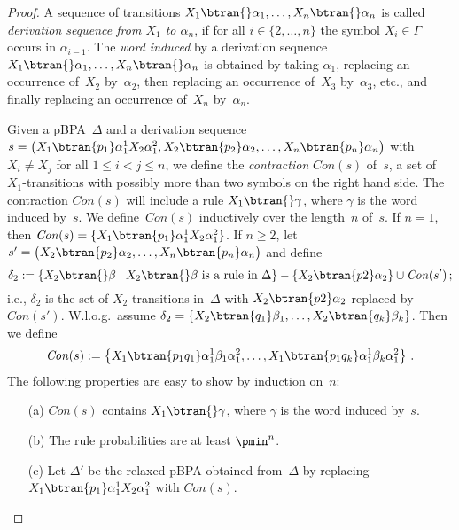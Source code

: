 \begin{proof}
\newcommand{\Con}{\mathit{Con}}
A sequence of transitions $X_1 \btran{} \alpha_1, \ldots,  X_n \btran{} \alpha_n$ is called {\em derivation sequence from $X_1$ to $\alpha_n$},
 if for all $i \in \{2, \ldots, n\}$ the symbol $X_i \in \Gamma$ occurs in $\alpha_{i-1}$.
The {\em word induced} by a derivation sequence $X_1 \btran{} \alpha_1, \ldots,  X_n \btran{} \alpha_n$
 is obtained by taking $\alpha_1$, replacing an occurrence of~$X_2$ by~$\alpha_2$,
 then replacing an occurrence of~$X_3$ by~$\alpha_3$, etc., and finally replacing an occurrence of~$X_n$ by~$\alpha_n$.

Given a pBPA~$\Delta$ and a derivation sequence
 $s = \big( X_1 \btran{p_1} \alpha_1^1 X_2 \alpha_1^2, X_2 \btran{p_2} \alpha_2, \ldots,  X_n \btran{p_n} \alpha_{n} \big)$
 with $X_i \ne X_j$ for all $1 \le i < j \le n$,
we define the {\em contraction} $\Con(s)$ of~$s$, a set of $X_1$-transitions with possibly more than two symbols on the right hand side.
The contraction $\Con(s)$ will include a rule $X_1 \btran{} \gamma$, where $\gamma$ is the word induced by~$s$.
We define~$\Con(s)$ inductively over the length~$n$ of~$s$.
If $n = 1$, then $\Con(s) = \{X_1 \btran{p_1} \alpha_1^1 X_2 \alpha_1^2\}$.
If $n \ge 2$, let $s' = \big( X_2 \btran{p_2} \alpha_{2}, \ldots,  X_n \btran{p_n} \alpha_{n} \big)$ and define
 \begin{equation}
  \delta_2 := \left\{X_2 \btran{} \beta \mid \text{$X_2 \btran{} \beta$ is a rule in~$\Delta$} \right\}
    - \left\{ X_2 \btran{p2} \alpha_2 \right\}
    \cup \Con(s')\,; \label{eq:delta-2}
 \end{equation}
 i.e., $\delta_2$ is the set of $X_2$-transitions in~$\Delta$ with $X_2 \btran{p2} \alpha_2$ replaced by $\Con(s')$.
W.l.o.g.\ assume $\delta_2 = \{ X_2 \btran{q_{1}} \beta_1, \ldots, X_2 \btran{q_{k}} \beta_k \}$.
Then we define
 \[
  \Con(s) := \left\{ X_1 \btran{p_1q_1} \alpha_1^1 \beta_1 \alpha_1^2, \ldots, X_1 \btran{p_1q_k} \alpha_1^1 \beta_k \alpha_1^2 \right\}\,.
 \]
The following properties are easy to show by induction on~$n$:
\begin{itemize}
 \item[(a)]
  $\Con(s)$ contains $X_1 \btran{} \gamma$, where $\gamma$ is the word induced by~$s$.
 \item[(b)]
  The rule probabilities are at least $\pmin^n$.
 \item[(c)]
  Let $\Delta'$ be the relaxed pBPA obtained from~$\Delta$ by replacing $X_1 \btran{p_1} \alpha_1^1 X_2 \alpha_1^2$ with $\Con(s)$.

\end{itemize}
\end{proof}
